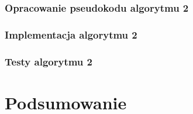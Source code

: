 \documentclass[a4paper]{article}
\begin{document}
\subsubsection{Opracowanie pseudokodu algorytmu 2}
\subsubsection{Implementacja algorytmu 2}
\subsubsection{Testy algorytmu 2}


\section{Podsumowanie}
\end{document}
